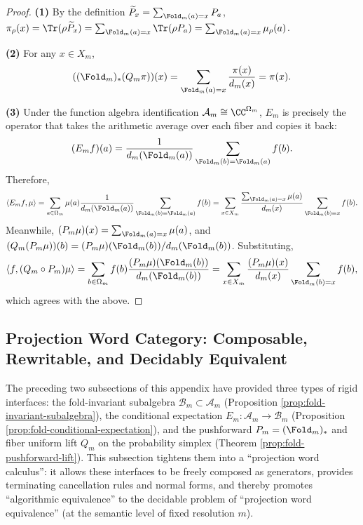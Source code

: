 \begin{proof}
\textbf{(1)} By the definition \(\widetilde P_x=\sum_{\Fold_m(a)=x}P_a\),
\(
\pi_\rho(x)=\Tr(\rho\widetilde P_x)=\sum_{\Fold_m(a)=x}\Tr(\rho P_a)=\sum_{\Fold_m(a)=x}\mu_\rho(a)
\).

\textbf{(2)} For any $x\in X_m$,
\[
((\Fold_m)_*(Q_m\pi))(x)=\sum_{\Fold_m(a)=x}\frac{\pi(x)}{d_m(x)}=\pi(x).
\]

\textbf{(3)} Under the function algebra identification $\mathcal{A}_m\cong \CC^{\Omega_m}$, $E_m$ is precisely the operator that takes the arithmetic average over each fiber and copies it back:
\[
(E_m f)(a)=\frac{1}{d_m(\Fold_m(a))}\sum_{\Fold_m(b)=\Fold_m(a)} f(b).
\]
Therefore,
\[
\langle E_m f,\mu\rangle
=\sum_{a\in\Omega_m}\mu(a)\frac{1}{d_m(\Fold_m(a))}\sum_{\Fold_m(b)=\Fold_m(a)} f(b)
=\sum_{x\in X_m}\frac{\sum_{\Fold_m(a)=x}\mu(a)}{d_m(x)}\sum_{\Fold_m(b)=x}f(b).
\]
Meanwhile, $(P_m\mu)(x)=\sum_{\Fold_m(a)=x}\mu(a)$, and $(Q_m(P_m\mu))(b)=(P_m\mu)(\Fold_m(b))/d_m(\Fold_m(b))$. Substituting,
\[
\langle f,(Q_m\circ P_m)\mu\rangle
=\sum_{b\in\Omega_m} f(b)\frac{(P_m\mu)(\Fold_m(b))}{d_m(\Fold_m(b))}
=\sum_{x\in X_m}\frac{(P_m\mu)(x)}{d_m(x)}\sum_{\Fold_m(b)=x}f(b),
\]
which agrees with the above.
\end{proof}

\subsection{Projection Word Category: Composable, Rewritable, and Decidably Equivalent}\label{app:op-algebra-projection-word}
The preceding two subsections of this appendix have provided three types of rigid interfaces: the fold-invariant subalgebra \(\mathcal{B}_m\subset\mathcal{A}_m\) (Proposition \ref{prop:fold-invariant-subalgebra}), the conditional expectation \(E_m:\mathcal{A}_m\to\mathcal{B}_m\) (Proposition \ref{prop:fold-conditional-expectation}), and the pushforward \(P_m=(\Fold_m)_*\) and fiber uniform lift \(Q_m\) on the probability simplex (Theorem \ref{prop:fold-pushforward-lift}).
This subsection tightens them into a ``projection word calculus'': it allows these interfaces to be freely composed as generators, provides terminating cancellation rules and normal forms, and thereby promotes ``algorithmic equivalence'' to the decidable problem of ``projection word equivalence'' (at the semantic level of fixed resolution \(m\)).

